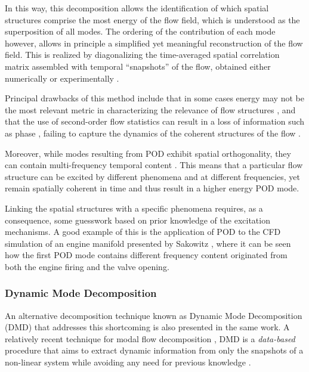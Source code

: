 In this way, this decomposition allows the identification of which spatial structures comprise the most energy of the flow field, which is understood as the superposition of all modes. The ordering of the contribution of each mode however, allows in principle a simplified yet meaningful reconstruction of the flow field. This is realized by diagonalizing the time-averaged spatial correlation matrix assembled with temporal ``snapshots'' of the flow, obtained either numerically or experimentally \cite{schmid2010dynamic,bagheri2013koopman}.

Principal drawbacks of this method include that in some cases energy may not be the most relevant metric in characterizing the relevance of flow structures \cite{schmid2010dynamic}, and that the use of second-order flow statistics can result in a loss of information such as phase \cite{aubry1991hidden}, failing to capture the dynamics of the coherent structures of the flow \cite{schmid2011applications}.

Moreover, while modes resulting from POD exhibit spatial orthogonality, they can contain multi-frequency temporal content \cite{jovanovic2014sparsity,sakowitz2014flow}. This means that a particular flow structure can be excited by different phenomena and at different frequencies, yet remain spatially coherent in time and thus result in a higher energy POD mode. 

Linking the spatial structures with a specific phenomena requires, as a consequence, some guesswork based on prior knowledge of the excitation mechanisms. A good example of this is the application of POD to the CFD simulation of an engine manifold presented by Sakowitz \cite{sakowitz2014flow}, where it can be seen how the first POD mode contains different frequency content originated from both the engine firing and the valve opening.

\subsubsection{Dynamic Mode Decomposition}

An alternative decomposition technique known as Dynamic Mode Decomposition (DMD) that addresses this shortcoming is also presented in the same work. A relatively recent technique for modal flow decomposition \cite{rowley2009spectral,schmid2010dynamic,chen2012variants}, DMD is a \textit{data-based} procedure that aims to extract dynamic information from only the snapshots of a non-linear system while avoiding any need for previous knowledge \cite{schmid2010dynamic}. 

